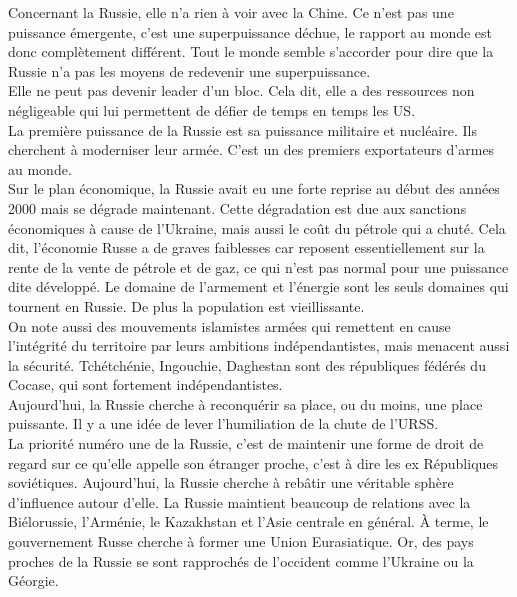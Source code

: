 \documentclass[10pt, a4paper, openany]{book}
\begin{document}
Concernant la Russie, elle n'a rien à voir avec la Chine. Ce n'est pas une puissance émergente, c'est une superpuissance déchue, le rapport au monde est donc complètement différent. Tout le monde semble s'accorder pour dire que la Russie n'a pas les moyens de redevenir une superpuissance. \\
Elle ne peut pas devenir leader d'un bloc. Cela dit, elle a des ressources non négligeable qui lui permettent de défier de temps en temps les US. \\
La première puissance de la Russie est sa puissance militaire et nucléaire. Ils cherchent à moderniser leur armée. C'est un des premiers exportateurs d'armes au monde. \\
Sur le plan économique, la Russie avait eu une forte reprise au début des années 2000 mais se dégrade maintenant. Cette dégradation est due aux sanctions économiques à cause de l'Ukraine, mais aussi le coût du pétrole qui a chuté. Cela dit, l'économie Russe a de graves faiblesses car reposent essentiellement sur la rente de la vente de pétrole et de gaz, ce qui n'est pas normal pour une puissance dite développé. Le domaine de l'armement et l'énergie sont les seuls domaines qui tournent en Russie. De plus la population est vieillissante. \\
On note aussi des mouvements islamistes armées qui remettent en cause l'intégrité du territoire par leurs ambitions indépendantistes, mais menacent aussi la sécurité. Tchétchénie, Ingouchie, Daghestan sont des républiques fédérés du Cocase, qui sont fortement indépendantistes. \\
Aujourd'hui, la Russie cherche à reconquérir sa place, ou du moins, une place puissante. Il y a une idée de lever l'humiliation de la chute de l'URSS. \\
La priorité numéro une de la Russie, c'est de maintenir une forme de droit de regard sur ce qu'elle appelle son étranger proche, c'est à dire les ex Républiques soviétiques. Aujourd'hui, la Russie cherche à rebâtir une véritable sphère d'influence autour d'elle. La Russie maintient beaucoup de relations avec la Biélorussie, l'Arménie, le Kazakhstan et l'Asie centrale en général. À terme, le gouvernement Russe cherche à former une Union Eurasiatique. Or, des pays proches de la Russie se sont rapprochés de l'occident comme l'Ukraine ou la Géorgie. 
\end{document}
